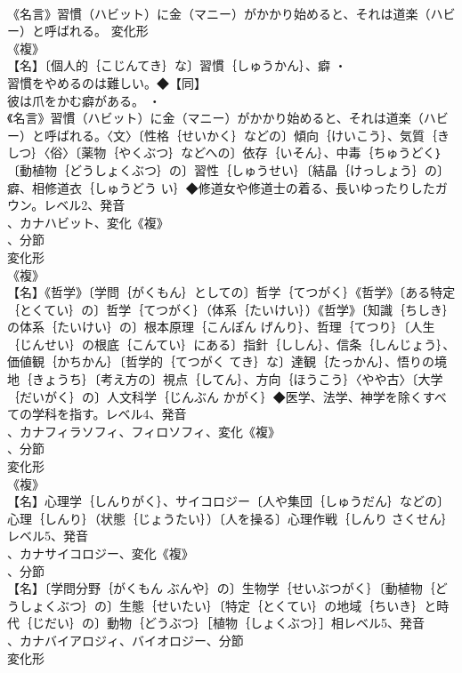 \documentclass[8pt]{extreport}
\begin{document}
\begin{CJK}{UTF8}{min}
\\	《名言》習慣（ハビット）に金（マニー）がかかり始めると、それは道楽（ハビー）と呼ばれる。	変化形 
\\	《複》
\\	【名】〔個人的｛こじんてき｝な〕習慣｛しゅうかん｝、癖 ・
\\	習慣をやめるのは難しい。◆【同】
\\	彼は爪をかむ癖がある。 ・
\\	《名言》習慣（ハビット）に金（マニー）がかかり始めると、それは道楽（ハビー）と呼ばれる。〈文〉〔性格｛せいかく｝などの〕傾向｛けいこう｝、気質｛きしつ｝〈俗〉〔薬物｛やくぶつ｝などへの〕依存｛いそん｝、中毒｛ちゅうどく｝〔動植物｛どうしょくぶつ｝の〕習性｛しゅうせい｝〔結晶｛けっしょう｝の〕癖、相修道衣｛しゅうどう い｝◆修道女や修道士の着る、長いゆったりしたガウン。レベル2、発音
\\	、カナハビット、変化《複》
\\	、分節
\\	変化形 
\\	《複》
\\	【名】《哲学》〔学問｛がくもん｝としての〕哲学｛てつがく｝《哲学》〔ある特定｛とくてい｝の〕哲学｛てつがく｝（体系｛たいけい｝）《哲学》〔知識｛ちしき｝の体系｛たいけい｝の〕根本原理｛こんぽん げんり｝、哲理｛てつり｝〔人生｛じんせい｝の根底｛こんてい｝にある〕指針｛ししん｝、信条｛しんじょう｝、価値観｛かちかん｝〔哲学的｛てつがく てき｝な〕達観｛たっかん｝、悟りの境地｛きょうち｝〔考え方の〕視点｛してん｝、方向｛ほうこう｝〈やや古〉〔大学｛だいがく｝の〕人文科学｛じんぶん かがく｝◆医学、法学、神学を除くすべての学科を指す。レベル4、発音
\\	、カナフィラソフィ、フィロソフィ、変化《複》
\\	、分節
\\	変化形 
\\	《複》
\\	【名】心理学｛しんりがく｝、サイコロジー〔人や集団｛しゅうだん｝などの〕心理｛しんり｝（状態｛じょうたい｝）〔人を操る〕心理作戦｛しんり さくせん｝レベル5、発音
\\	、カナサイコロジー、変化《複》
\\	、分節
\\	【名】〔学問分野｛がくもん ぶんや｝の〕生物学｛せいぶつがく｝〔動植物｛どうしょくぶつ｝の〕生態｛せいたい｝〔特定｛とくてい｝の地域｛ちいき｝と時代｛じだい｝の〕動物｛どうぶつ｝［植物｛しょくぶつ｝］相レベル5、発音
\\	、カナバイアロジィ、バイオロジー、分節
\\	変化形 

\end{CJK}
\end{document}
